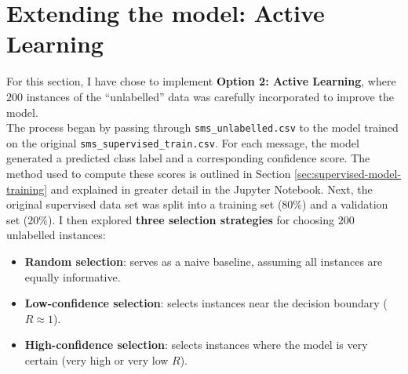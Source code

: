 \documentclass[a4paper,12pt]{article}
\begin{document}
\begin{table}[h!]
\centering
{}
\caption{Boundary Cases (Confidence Ratio $\approx 1$)}
\label{tab:boundary_predictions}
\end{table}
    
\newpage

\section{Extending the model: Active Learning}

For this section, I have chose to implement \textbf{Option 2: Active Learning}, where $200$ instances of the ``unlabelled'' data was carefully incorporated to improve the model. \\

The process began by passing through \texttt{sms\_unlabelled.csv} to the model trained on the original \texttt{sms\_supervised\_train.csv}. For each message, the model generated a predicted class label and a corresponding confidence score. The method used to compute these scores is outlined in Section \ref{sec:supervised-model-training} and explained in greater detail in the Jupyter Notebook. Next, the original supervised data set was split into a training set ($80\%$) and a validation set ($20\%$). I then explored \textbf{three selection strategies} for choosing $200$ unlabelled instances:

\begin{itemize}
    \item \textbf{Random selection}: serves as a naive baseline, assuming all instances are equally informative.
    \item \textbf{Low-confidence selection}: selects instances near the decision boundary ($R \approx 1$).
    \item \textbf{High-confidence selection}: selects instances where the model is very certain (very high or very low $R$).
\end{itemize}
\end{document}
